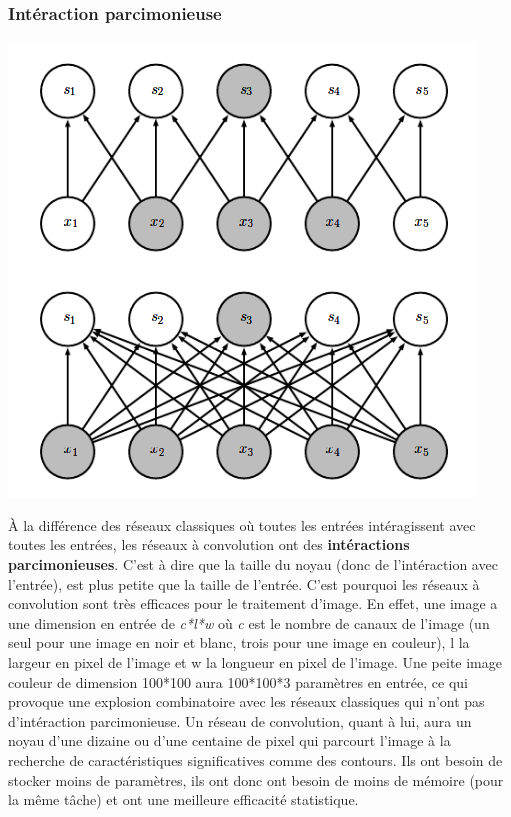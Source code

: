 \documentclass[11pt]{article}
\begin{document}
\subsubsection{Intéraction parcimonieuse}
\label{sec:org75f3c5a}
\begin{center}
\includegraphics[width=.9\linewidth]{sparse_vs_dense.png}
\end{center}
À la différence des réseaux classiques où toutes les entrées intéragissent avec toutes les entrées, les réseaux à convolution ont des \textbf{intéractions parcimonieuses}. 
C'est à dire que la taille du noyau (donc de l'intéraction avec l'entrée), est plus petite que la taille de l'entrée.
C'est pourquoi les réseaux à convolution sont très efficaces pour le traitement d'image.
En effet, une image a une dimension en entrée de \emph{c*l*w} où \emph{c} est le nombre de canaux de l'image (un seul pour une image en noir et blanc, trois pour une image en couleur), l la largeur en pixel de l'image et w la longueur en pixel de l'image.
Une peite image couleur de dimension 100*100 aura 100*100*3 paramètres en entrée, ce qui provoque une explosion combinatoire avec les réseaux classiques qui n'ont pas d'intéraction parcimonieuse.
Un réseau de convolution, quant à lui, aura un noyau d'une dizaine ou d'une centaine de pixel qui parcourt l'image à la recherche de caractéristiques significatives comme des contours.
Ils ont besoin de stocker moins de paramètres, ils ont donc ont besoin de moins de mémoire (pour la même tâche) et ont une meilleure efficacité statistique.
\end{document}
